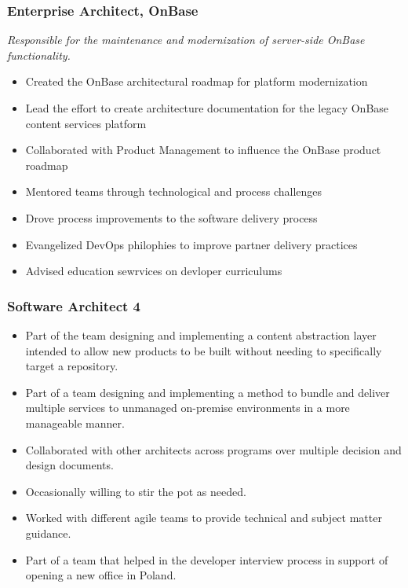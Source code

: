\documentclass{cv_style}
\begin{document}
			\subsubsection*{Enterprise Architect, OnBase}
			\textit{Responsible for the maintenance and modernization of server-side OnBase functionality.}
			\begin{itemize}
				\item Created the OnBase architectural roadmap for platform modernization
				\item Lead the effort to create architecture documentation for the legacy OnBase content services platform 
				\item Collaborated with Product Management to influence the OnBase product roadmap
				\item Mentored teams through technological and process challenges
				\item Drove process improvements to the software delivery process
				\item Evangelized DevOps philophies to improve partner delivery practices
				\item Advised education sewrvices on devloper curriculums
			\end{itemize}

			\subsubsection*{Software Architect 4}
			\textit{}
			\begin{itemize}
				\item Part of the team designing and implementing a content abstraction layer intended to allow new products to be built without needing to specifically target a repository.
				\item Part of a team designing and implementing a method to bundle and deliver multiple services to unmanaged on-premise environments in a more manageable manner.
				\item Collaborated with other architects across programs over multiple decision and design documents.
				\item Occasionally willing to stir the pot as needed.
				\item Worked with different agile teams to provide technical and subject matter guidance.
				\item Part of a team that helped in the developer interview process in support of opening a new office in Poland.
			\end{itemize}
\end{document}
